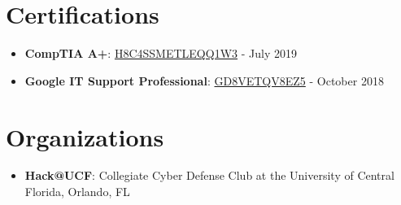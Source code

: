 \documentclass[letterpaper,11pt]{article}
\newcommand{\resumeItem}[2]{
  \item\small{
    \textbf{#1}{: #2 \vspace{-2pt}}
  }
}
\newcommand{\resumeSubItem}[2]{\resumeItem{#1}{#2}\vspace{-4pt}}
\newcommand{\resumeSubHeadingListStart}{\begin{itemize}[leftmargin=*]}
\newcommand{\resumeSubHeadingListEnd}{\end{itemize}}
\begin{document}
\section{Certifications}
  \resumeSubHeadingListStart
    \resumeSubItem{CompTIA A+}
      {\href{https://www.certmetrics.com/comptia/public/verification.aspx?code=H8C4SSMETLEQQ1W3}{H8C4SSMETLEQQ1W3}} - {{July 2019}}
    \resumeSubItem{Google IT Support Professional}
      {\href{https://www.coursera.org/account/accomplishments/professional-cert/certificate/GD8VETQV8EZ5}{GD8VETQV8EZ5}} - {{October 2018}}
  \resumeSubHeadingListEnd

\section{Organizations}
  \resumeSubHeadingListStart
    \resumeSubItem{Hack@UCF}
      {Collegiate Cyber Defense Club at the University of Central Florida, Orlando, FL}
  \resumeSubHeadingListEnd

\end{document}
